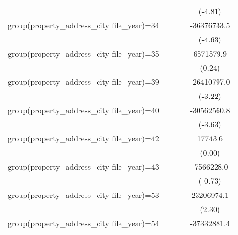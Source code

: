 {\begin{tabular}{l*{4}{c}}
                    &                     &                     &                     &     (-4.81)         \\
\addlinespace
group(property\_address\_city file\_year)=34&                     &                     &                     & -36376733.5\sym{***}\\
                    &                     &                     &                     &     (-4.63)         \\
\addlinespace
group(property\_address\_city file\_year)=35&                     &                     &                     &   6571579.9         \\
                    &                     &                     &                     &      (0.24)         \\
\addlinespace
group(property\_address\_city file\_year)=39&                     &                     &                     & -26410797.0\sym{**} \\
                    &                     &                     &                     &     (-3.22)         \\
\addlinespace
group(property\_address\_city file\_year)=40&                     &                     &                     & -30562560.8\sym{***}\\
                    &                     &                     &                     &     (-3.63)         \\
\addlinespace
group(property\_address\_city file\_year)=42&                     &                     &                     &     17743.6         \\
                    &                     &                     &                     &      (0.00)         \\
\addlinespace
group(property\_address\_city file\_year)=43&                     &                     &                     &  -7566228.0         \\
                    &                     &                     &                     &     (-0.73)         \\
\addlinespace
group(property\_address\_city file\_year)=53&                     &                     &                     &  23206974.1\sym{*}  \\
                    &                     &                     &                     &      (2.30)         \\
\addlinespace
group(property\_address\_city file\_year)=54&                     &                     &                     & -37332881.4\sym{***}\\

\end{tabular}}
